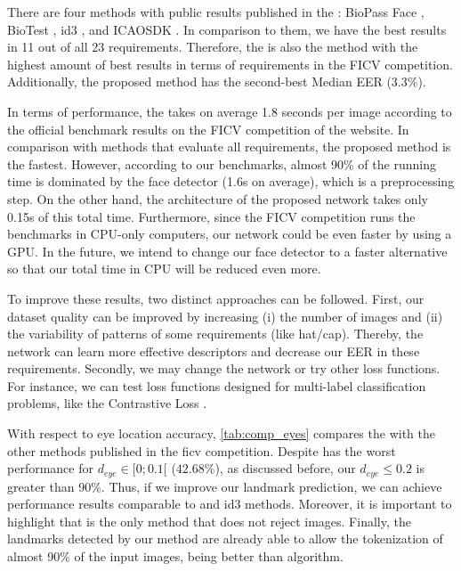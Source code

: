 

There are four methods with public results published in the \fvcongoing: BioPass Face \citep{fvcVsoft}, BioTest \citep{fvcBioTest}, id3 \citep{fvcICAOCompliance}, and ICAOSDK \citep{fvcSeamfix}. In comparison to them, we have the best results in 11 out of all 23 requirements. Therefore, the \methodname is also the method with the highest amount of best results in terms of requirements in the FICV competition. Additionally, the proposed method has the second-best Median EER (3.3\%).

In terms of performance, the \methodname takes on average 1.8 seconds per image according to the official benchmark results on the FICV competition of the \fvcongoing website. In comparison with methods that evaluate all requirements, the proposed method is the fastest. However, according to our benchmarks, almost 90\% of the \methodname running time is dominated by the face detector (1.6s on average), which is a preprocessing step. On the other hand, the architecture of the proposed network takes only 0.15s of this total time. Furthermore, since the FICV competition runs the benchmarks in CPU-only computers, our network could be even faster by using a GPU. In the future, we intend to change our face detector to a faster alternative so that our total time in CPU will be reduced even more.

To improve these results, two distinct approaches can be followed. First, our dataset quality can be improved by increasing (i) the number of images and (ii) the variability of patterns of some requirements (like hat/cap). Thereby, the network can learn more effective descriptors and decrease our EER in these requirements. Secondly, we may change the network or try other loss functions. For instance, we can test loss functions designed for multi-label classification problems, like the Contrastive Loss \citep{khosla2020supervised}.

With respect to eye location accuracy, \autoref{tab:comp_eyes} compares the \methodname with the other methods published in the \acs{ficv} competition. Despite \methodname has the worst performance for $d_{eye} \in [0;0.1[$ ($42.68\%$), as discussed before, our $d_{eye} \leq 0.2$ is greater than 90\%. Thus, if we improve our landmark prediction, we can achieve performance results comparable to \biopass and id3 methods. Moreover, it is important to highlight that \methodname is the only method that does not reject images. Finally, the landmarks detected by our method are already able to allow the tokenization of almost 90\% of the input images, being better than \biotest algorithm.

